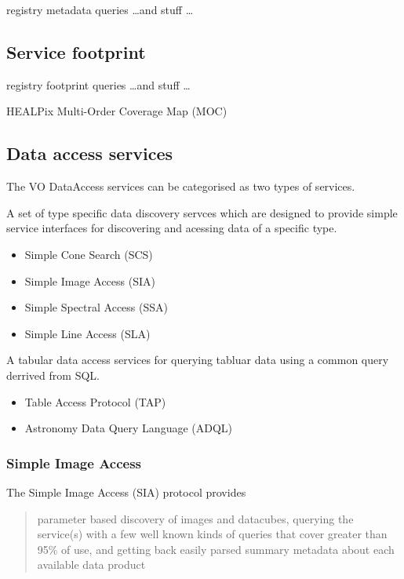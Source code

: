 \documentclass{article}
\begin{document}
{registry metadata queries \ldots and stuff \ldots

\subsection{Service footprint}

registry footprint queries \ldots and stuff \ldots

HEALPix Multi-Order Coverage Map (MOC)

\subsection{Data access services}

The VO DataAccess services can be categorised as two types of services.

A set of type specific data discovery servces which are designed to provide
simple service interfaces for discovering and acessing data of a specific type.

\begin{itemize}
  \item Simple Cone Search (SCS)
  \item Simple Image Access (SIA)
  \item Simple Spectral Access (SSA)
  \item Simple Line Access (SLA)
\end{itemize}

A tabular data access services for querying tabluar data using a common query
derrived from SQL.

\begin{itemize}
  \item Table Access Protocol (TAP)
  \item Astronomy Data Query Language (ADQL)
\end{itemize}

\subsubsection{Simple Image Access}

The Simple Image Access (SIA) protocol provides 
\begin{quote}
parameter based discovery of images and datacubes, querying the service(s) with
a few well known kinds of queries that cover greater than 95\% of use, and
getting back easily parsed summary metadata about each available data product
\end{quote}

}
\end{document}
